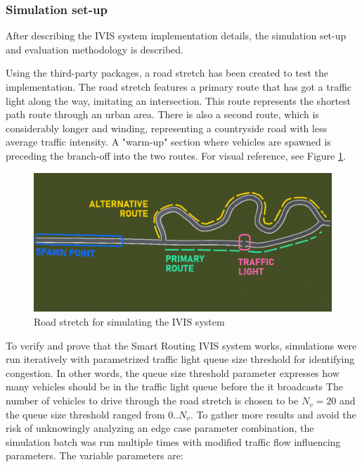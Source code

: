 \documentclass[0main.tex]{subfiles}
\begin{document}
\subsubsection{Simulation set-up}

After describing the IVIS system implementation details, the simulation set-up and evaluation
methodology is described. 

Using the third-party packages, a road stretch has been created to test the implementation.
The road stretch features a primary route that has got a traffic light along the way, imitating 
an intersection. This route represents the shortest path route through an urban area. 
There is also a second route, which is considerably longer and winding, representing a countryside 
road with less average traffic intensity. A "warm-up" section where vehicles are spawned is
preceding the branch-off into the two routes. For visual reference, see Figure
\ref{fig-routeMap}.

\begin{figure}[htbp]
    \centering
    \includegraphics[width=.9\textwidth]{test-route-map-legend.png}
    \caption{Road stretch for simulating the IVIS system}
    \label{fig-routeMap}
\end{figure}

To verify and prove that the Smart Routing IVIS system works, simulations were run iteratively with 
parametrized traffic light queue size threshold for identifying congestion. In other words, the 
queue size threshold parameter expresses how many vehicles should be in the traffic light queue before the 
it broadcasts 
The number 
of vehicles to drive through the road stretch is chosen to be $N_v = 20 $ and the queue size 
threshold ranged from $0..N_v$. To gather more results 
and avoid the risk of unknowingly analyzing an edge case parameter combination, the simulation batch 
was run multiple times with modified traffic flow influencing parameters. The variable parameters are:
\end{document}
